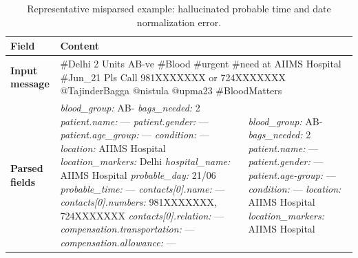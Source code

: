 \documentclass[11pt]{article}
\begin{document}
\begin{table}[t]
\centering
\small
\caption{Representative misparsed example: hallucinated probable time and date normalization error.}
\label{tab:misparsed-2-time-date}
\begin{tabularx}{\textwidth}{@{}p{}XX@{}}
\toprule
\textbf{Field} & \multicolumn{2}{l}{\textbf{Content}} \\
\midrule
\textbf{Input message} &
\multicolumn{2}{p{0.75\textwidth}}{\#Delhi 2 Units AB-ve \#Blood \#urgent \#need at AIIMS Hospital \#Jun\_21 Pls Call 981XXXXXXX or 724XXXXXXX @TajinderBagga @nistula @upma23 \#BloodMatters} \\
\midrule
\textbf{Parsed fields} &
{\ttfamily\footnotesize
\textit{blood\_group:} AB-\newline
\textit{bags\_needed:} 2\newline
\textit{patient.name:} ---\newline
\textit{patient.gender:} ---\newline
\textit{patient.age\_group:} ---\newline
\textit{condition:} ---\newline
\textit{location:} AIIMS Hospital\newline
\textit{location\_markers:} Delhi\newline
\textit{hospital\_name:} AIIMS Hospital\newline
\textit{probable\_day:} 21/06\newline
\textit{probable\_time:} ---\newline
\textit{contacts[0].name:} ---\newline
\textit{contacts[0].numbers:} 981XXXXXXX, 724XXXXXXX\newline
\textit{contacts[0].relation:} ---\newline
\textit{compensation.transportation:} ---\newline
\textit{compensation.allowance:} ---
} &
{\ttfamily\footnotesize
\textit{blood\_group:} AB-\newline
\textit{bags\_needed:} 2\newline
\textit{patient.name:} ---\newline
\textit{patient.gender:} ---\newline
\textit{patient.age-group:} ---\newline
\textit{condition:} ---\newline
\textit{location:} AIIMS Hospital\newline
\textit{location\_markers:} AIIMS Hospital\newline
}
\end{tabularx}
\end{table}
\end{document}
